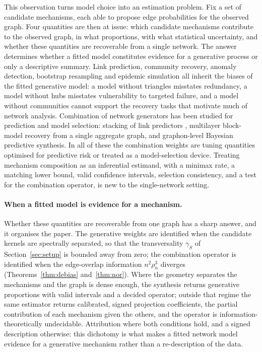 \documentclass[12pt]{article}
\newcommand{\1}{\mathbf{1}}
\begin{document}
This observation turns model choice into an estimation problem. Fix a set of candidate mechanisms,
each able to propose edge probabilities for the observed graph. Four quantities are then at issue: which candidate mechanisms contribute to the observed graph, in
what proportions, with what statistical uncertainty, and whether these quantities are recoverable
from a single network. The answer determines whether a fitted model constitutes evidence for a
generative process or only a descriptive summary. Link prediction, community recovery, anomaly detection, bootstrap resampling and
epidemic simulation all inherit the biases of the fitted generative model: a model without triangles
misstates redundancy, a model without hubs misstates vulnerability to targeted failure, and a model
without communities cannot support the recovery tasks that motivate much of network analysis. Combination of network generators has been studied for prediction and model selection: stacking of
link predictors \citep{ghasemian2020stacking}, multilayer block-model recovery from a single aggregate graph, and graphon-level Bayesian predictive synthesis. In all of these the combination weights are tuning quantities
optimised for predictive risk or treated as a model-selection device. Treating mechanism composition as an inferential estimand, with a minimax rate, a matching lower
bound, valid confidence intervals, selection consistency, and a test for the combination operator, is
new to the single-network setting.

\paragraph{When a fitted model is evidence for a mechanism.}
Whether these quantities are recoverable from one graph has a sharp answer, and it organises the paper.
The generative weights are identified when the candidate kernels are spectrally separated, so that the
transversality $\gamma_S$ of Section~\ref{sec:setup} is bounded away from zero; the combination operator
is identified when the edge-overlap information $n^2\rho_n^3$ diverges (Theorems~\ref{thm:debias}
and~\ref{thm:nor}). Where the geometry separates the mechanisms and the graph is dense enough, the
synthesis returns generative proportions with valid intervals and a decided operator; outside that regime
the same estimator returns calibrated, signed projection coefficients, the partial contribution of each
mechanism given the others, and the operator is information-theoretically undecidable. Attribution where
both conditions hold, and a signed description otherwise: this dichotomy is what makes a fitted network
model evidence for a generative mechanism rather than a re-description of the data.
\end{document}
